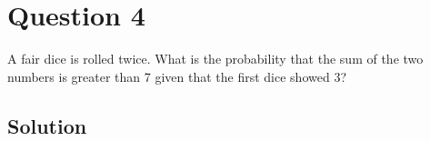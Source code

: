 \section*{Question 4}

A fair dice is rolled twice.
What is the probability that the sum of the two numbers is greater than 7 given that the first dice showed 3?

\subsection*{Solution}
